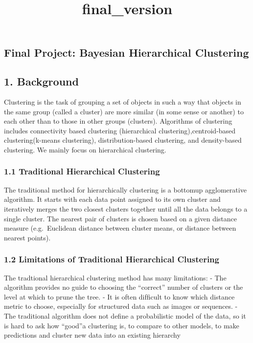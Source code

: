 \documentclass{article}
\title{final\_version}
\begin{document}
    
    
    \maketitle
    
    

    
    \subsection{Final Project: Bayesian Hierarchical
Clustering}\label{final-project-bayesian-hierarchical-clustering}

\subsection{1. Background}\label{background}

Clustering is the task of grouping a set of objects in such a way that
objects in the same group (called a cluster) are more similar (in some
sense or another) to each other than to those in other groups
(clusters). Algorithms of clustering includes connectivity based
clustering (hierarchical clustering),centroid-based clustering(k-means
clustering), distribution-based clustering, and density-based
clustering. We mainly focus on hierarchical clustering.

\subsubsection{1.1 Traditional Hierarchical
Clustering}\label{traditional-hierarchical-clustering}

The traditional method for hierarchically clustering is a bottomup
agglomerative algorithm. It starts with each data point assigned to its
own cluster and iteratively merges the two closest clusters together
until all the data belongs to a single cluster. The nearest pair of
clusters is chosen based on a given distance measure (e.g.~Euclidean
distance between cluster means, or distance between nearest points).

\subsubsection{1.2 Limitations of Traditional Hierarchical
Clustering}\label{limitations-of-traditional-hierarchical-clustering}

The tradtional hierarchical clustering method has many limitations: -
The algorithm provides no guide to choosing the ``correct'' number of
clusters or the level at which to prune the tree. - It is often difﬁcult
to know which distance metric to choose, especially for structured data
such as images or sequences. - The traditional algorithm does not deﬁne
a probabilistic model of the data, so it is hard to ask how ``good''a
clustering is, to compare to other models, to make predictions and
cluster new data into an existing hierarchy
\end{document}
